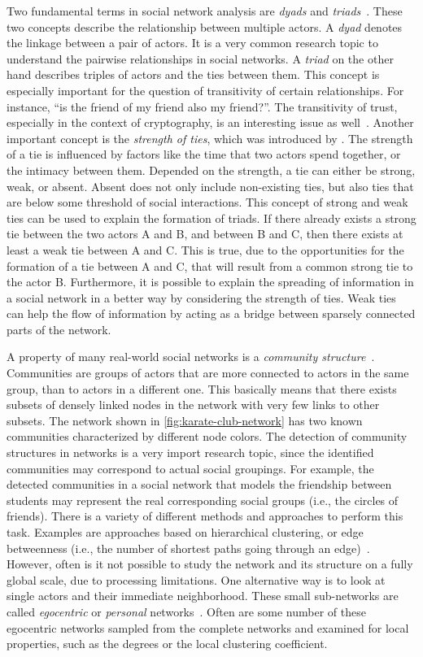 Two fundamental terms in social network analysis are \emph{dyads} and \emph{triads}~\cite{Wasserman1994}.
These two concepts describe the relationship between multiple actors.
A \emph{dyad} denotes the linkage between a pair of actors.
It is a very common research topic to understand the pairwise relationships in social networks.
A \emph{triad} on the other hand describes triples of actors and the ties between them.
This concept is especially important for the question of transitivity of certain relationships.
For instance, \enquote{is the friend of my friend also my friend?}.
The transitivity of trust, especially in the context of cryptography, is an interesting issue as well~\cite{Christianson1997}.
Another important concept is the \emph{strength of ties}, which was introduced by \citet{Granovetter1973}.
The strength of a tie is influenced by factors like the time that two actors spend together, or the intimacy between them.
Depended on the strength, a tie can either be strong, weak, or absent.
Absent does not only include non-existing ties, but also ties that are below some threshold of social interactions.
This concept of strong and weak ties can be used to explain the formation of triads.
If there already exists a strong tie between the two actors A and B, and between B and C, then there exists at least a weak tie between A and C.
This is true, due to the opportunities for the formation of a tie between A and C, that will result from a common strong tie to the actor B.
Furthermore, it is possible to explain the spreading of information in a social network in a better way by considering the strength of ties.
Weak ties can help the flow of information by acting as a bridge between sparsely connected parts of the network.

A property of many real-world social networks is a \emph{community structure}~\cite{Girvan2002}.
Communities are groups of actors that are more connected to actors in the same group, than to actors in a different one.
This basically means that there exists subsets of densely linked nodes in the network with very few links to other subsets.
The network shown in \autoref{fig:karate-club-network} has two known communities characterized by different node colors.
The detection of community structures in networks is a very import research topic, since the identified communities may correspond to actual social groupings.
For example, the detected communities in a social network that models the friendship between students may represent the real corresponding social groups (i.e., the circles of friends).
There is a variety of different methods and approaches to perform this task.
Examples are approaches based on hierarchical clustering, or edge betweenness (i.e., the number of shortest paths going through an edge)~\cite{Fortunato2010}.
However, often is it not possible to study the network and its structure on a fully global scale, due to processing limitations.
One alternative way is to look at single actors and their immediate neighborhood.
These small sub-networks are called \emph{egocentric} or \emph{personal} networks~\cite{Newman2010}.
Often are some number of these egocentric networks sampled from the complete networks and examined for local properties, such as the degrees or the local clustering coefficient.

